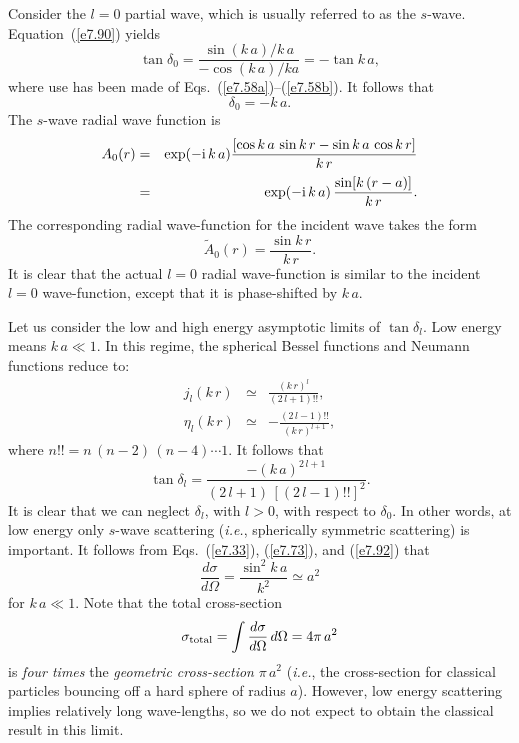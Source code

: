 Consider the $l=0$ partial wave, which is usually referred to as the $s$-wave.
Equation~(\ref{e7.90}) yields
\begin{equation}
\tan\delta_0 = \frac{\sin (k\,a)/k\,a}{-\cos (k\,a)/ka} = -\tan k\,a,
\end{equation}
where use has been made of Eqs.~(\ref{e7.58a})--(\ref{e7.58b}). It follows that
\begin{equation}\label{e7.92}
\delta_0 = -k\,a.
\end{equation}
The  $s$-wave radial wave function
is
\begin{eqnarray}
A_0(r) &= &\exp(-{\rm i}\, k\,a) \frac{[\cos k\,a \,\sin k\,r
-\sin k\,a \,\cos k\,r]}{k\,r}\nonumber\\[0.5ex]
&=& \exp(-{\rm i}\, k\,a)\, \frac{ \sin[k\,(r-a)]}{k\,r}.
\end{eqnarray}
The corresponding radial wave-function for the incident wave 
takes the form
\begin{equation}
\tilde{A}_0(r) = \frac{ \sin k\,r}{k\,r}.
\end{equation}
It is clear that the actual $l=0$ radial wave-function is similar to the
incident $l=0$ wave-function, except that it is phase-shifted by $k\,a$. 

Let us consider the low and high energy asymptotic limits of $\tan\delta_l$.
Low energy means $k\,a\ll 1$. In this regime, the spherical Bessel functions
and Neumann functions reduce to:
\begin{eqnarray}
j_l(k\,r) &\simeq & \frac{(k\,r)^l}{(2\,l+1)!!},\\[0.5ex]
\eta_l(k\,r) &\simeq & -\frac{(2\,l-1)!!}{(k\,r)^{l+1}},
\end{eqnarray}
where $n!! = n\,(n-2)\,(n-4)\cdots 1$. It follows that
\begin{equation}
\tan\delta_l = \frac{-(k\,a)^{2\,l+1}}{(2\,l+1) \,[(2\,l-1)!!]^2}.
\end{equation}
It is clear that we can neglect  $\delta_l$, with $l>0$, with respect to
$\delta_0$. In other words, at low energy only $s$-wave scattering
({\em i.e.}, spherically symmetric scattering) is important. It follows
from Eqs.~(\ref{e7.33}), (\ref{e7.73}), and (\ref{e7.92})  that 
\begin{equation}
\frac{d\sigma}{d\Omega} = \frac{\sin^2 k\,a}{k^2} \simeq a^2
\end{equation}
for $k\,a\ll 1$. Note that the total cross-section
\begin{equation}
\sigma_{\rm total} = \int\frac{d\sigma}{d\Omega}\,d\Omega = 4\pi \,a^2
\end{equation}
is {\em four times}\/ the {\em geometric cross-section}\/ $\pi \,a^2$
({\em i.e.}, the cross-section for classical particles bouncing off a
hard sphere of radius $a$). 
However, 
low energy scattering implies relatively long wave-lengths, so we do not
expect to obtain the  classical result  in this limit. 

